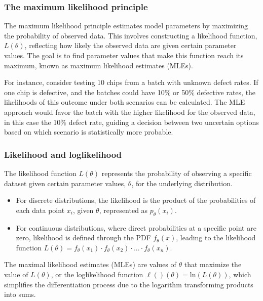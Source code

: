 \documentclass{article}
\begin{document}
\subsubsection{The maximum likelihood principle}

The maximum likelihood principle estimates model parameters by maximizing the probability of observed data. This involves constructing a likelihood function, $L(\theta)$, reflecting how likely the observed data are given certain parameter values. The goal is to find parameter values that make this function reach its maximum, known as maximum likelihood estimates (MLEs).

For instance, consider testing 10 chips from a batch with unknown defect rates. If one chip is defective, and the batches could have 10\% or 50\% defective rates, the likelihoods of this outcome under both scenarios can be calculated. The MLE approach would favor the batch with the higher likelihood for the observed data, in this case the 10\% defect rate, guiding a decision between two uncertain options based on which scenario is statistically more probable.

\subsubsection{Likelihood and loglikelihood}

The likelihood function $L(\theta)$ represents the probability of observing a specific dataset given certain parameter values, $\theta$, for the underlying distribution.

\begin{itemize}
    \item For discrete distributions, the likelihood is the product of the probabilities of each data point $x_i$, given $\theta$, represented as $p_{\theta}(x_i)$. 
    \item For continuous distributions, where direct probabilities at a specific point are zero, likelihood is defined through the PDF $f_{\theta}(x)$, leading to the likelihood function $L(\theta)=f_{\theta}(x_1) \cdot f_{\theta}(x_2) \cdot ... \cdot f_{\theta}(x_n)$.
\end{itemize}

The maximal likelihood estimates (MLEs) are values of $\theta$ that maximize the value of $L(\theta)$, or the loglikelihood function $\ell()(\theta)=\text{ln}(L(\theta))$, which simplifies the differentiation process due to the logarithm transforming products into sums.
\end{document}
